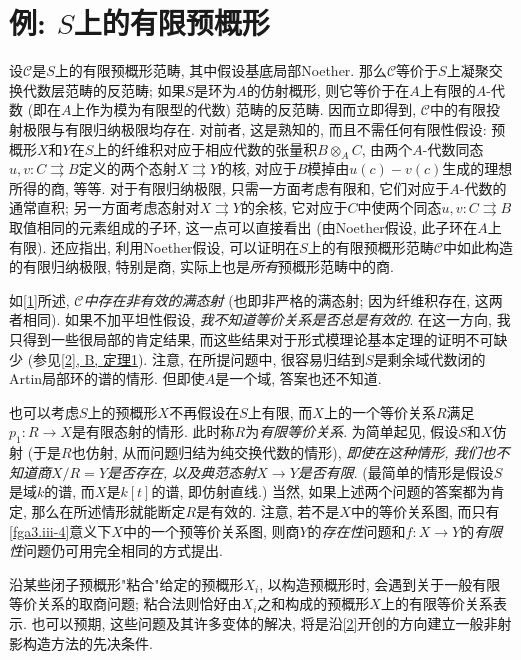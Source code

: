 \chapter{例: \(S\)上的有限预概形}\thispagestyle{fancy}\label{fga3.iii-2}
\par{}设\(\mathcal {C}\)是\(S\)上的有限预概形范畴, 其中假设基底局部Noether. 那么\(\mathcal {C}\)等价于\(S\)上凝聚交换代数层范畴的反范畴; 如果\(S\)是环为\(A\)的仿射概形, 则它等价于在\(A\)上有限的\(A\)-代数 (即在\(A\)上作为模为有限型的代数) 范畴的反范畴. 因而立即得到, \(\mathcal {C}\)中的有限投射极限与有限归纳极限均存在. 对前者, 这是熟知的, 而且不需任何有限性假设: 预概形\(X\)和\(Y\)在\(S\)上的纤维积对应于相应代数的张量积\(B\otimes _A C\), 由两个\(A\)-代数同态\(u,v\colon  C\rightrightarrows  B\)定义的两个态射\(X\rightrightarrows  Y\)的核, 对应于\(B\)模掉由\(u(c)-v(c)\)生成的理想所得的商, 等等. 对于有限归纳极限, 只需一方面考虑有限和, 它们对应于\(A\)-代数的通常直积; 另一方面考虑态射对\(X\rightrightarrows  Y\)的余核, 它对应于\(C\)中使两个同态\(u,v\colon  C\rightrightarrows  B\)取值相同的元素组成的子环, 这一点可以直接看出 (由Noether假设, 此子环在\(A\)上有限). 还应指出, 利用Noether假设, 可以证明在\(S\)上的有限预概形范畴\(\mathcal {C}\)中如此构造的有限归纳极限, 特别是商, 实际上也是\emph{所有}预概形范畴中的商.
\par{}如\hyperref[fga3.i]{[1]}所述, \emph{\(\mathcal {C}\)中存在非有效的满态射} (也即非严格的满态射; 因为纤维积存在, 这两者相同). 如果不加平坦性假设, \emph{我不知道等价关系是否总是有效的}. 在这一方向, 我只得到一些很局部的肯定结果, 而这些结果对于形式模理论基本定理的证明不可缺少 (参见\hyperref[fga3.ii-b-theorem-1]{[2], B, 定理1}). 注意, 在所提问题中, 很容易归结到\(S\)是剩余域代数闭的Artin局部环的谱的情形. 但即使\(A\)是一个域, 答案也还不知道.
\par{}也可以考虑\(S\)上的预概形\(X\)不再假设在\(S\)上有限, 而\(X\)上的一个等价关系\(R\)满足\(p_1\colon  R\to  X\)是有限态射的情形. 此时称\(R\)为\emph{有限等价关系}. 为简单起见, 假设\(S\)和\(X\)仿射 (于是\(R\)也仿射, 从而问题归结为纯交换代数的情形), \emph{即使在这种情形, 我们也不知道商\(X/R=Y\)是否存在, 以及典范态射\(X\to  Y\)是否有限}. (最简单的情形是假设\(S\)是域\(k\)的谱, 而\(X\)是\(k[t]\)的谱, 即仿射直线.) 当然, 如果上述两个问题的答案都为肯定, 那么在所述情形就能断定\(R\)是有效的. 注意, 若不是\(X\)中的等价关系图, 而只有\cref{fga3.iii-4}意义下\(X\)中的一个预等价关系图, 则商\(Y\)的\emph{存在性}问题和\(f\colon  X\to  Y\)的\emph{有限性}问题仍可用完全相同的方式提出.
\par{}沿某些闭子预概形"粘合"给定的预概形\(X_i\), 以构造预概形时, 会遇到关于一般有限等价关系的取商问题; 粘合法则恰好由\(X_i\)之和构成的预概形\(X\)上的有限等价关系表示. 也可以预期, 这些问题及其许多变体的解决, 将是沿\hyperref[fga3.ii]{[2]}开创的方向建立一般非射影构造方法的先决条件.
